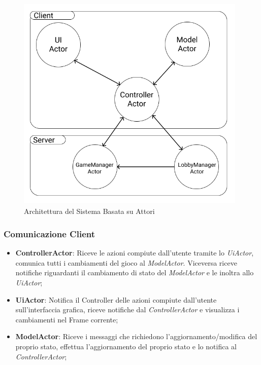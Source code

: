 \begin{figure}[ht]
\centering
\includegraphics[width=11cm, height=10.5cm]{img/ActorScheme.png}
\caption{Architettura del Sistema Basata su Attori}
\label{fig:ArchSisAct}
\end{figure}

\subsubsection{Comunicazione Client}
\begin{itemize}
    \item \textbf{ControllerActor}: Riceve le azioni compiute dall'utente tramite lo \textit{UiActor}, comunica tutti i cambiamenti del gioco al \textit{ModelActor}. Viceversa riceve notifiche riguardanti il cambiamento di stato del \textit{ModelActor} e le inoltra allo \textit{UiActor};
    \item \textbf{UiActor}: Notifica il Controller delle azioni compiute dall'utente sull'interfaccia grafica, riceve notifiche dal \textit{ControllerActor} e visualizza i cambiamenti nel Frame corrente;
    \item \textbf{ModelActor}: Riceve i messaggi che richiedono l'aggiornamento/modifica del proprio stato, effettua l'aggiornamento del proprio stato e lo notifica al \textit{ControllerActor};
\end{itemize}

